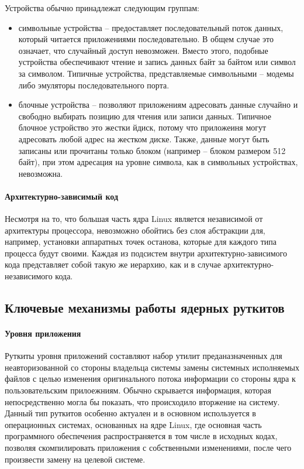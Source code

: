\documentclass{gost7.32-2001}
\begin{document}
Устройства обычно принадлежат следующим группам:
\begin{itemize}
\item
  символьные устройства – предоставляет последовательный поток данных,
  который читается приложениями последовательно. В общем случае это
  означает, что случайный доступ невозможен. Вместо этого, подобные
  устройства обеспечивают чтение и запись данных байт за байтом или
  символ за символом. Типичные устройства, представляемые символьными
  – модемы либо эмуляторы последовательного порта.
\item
  блочные устройства – позволяют приложениям адресовать данные
  случайно и свободно выбирать позицию для чтения или записи
  данных. Типичное блочное устройство это жестки йдиск, потому что
  приложеиня могут адресовать любой адрес на жестком диске. Также,
  данные могут быть записаны или прочитаны только блоком (например –
  блоком размером 512 байт), при этом адресация на уровне символа, как
  в символьных устройствах, невозможна.
\end{itemize}

\paragraph{Архитектурно-зависимый код}

Несмотря на то, что большая часть ядра Linux является независимой от
архитектуры процессора, невозможно обойтись без слоя абстракции для,
например, установки аппаратных точек останова, которые для каждого
типа процесса будут своими. Каждая из подсистем внутри
архитектурно-зависимого кода представляет собой такую же иерархию, как
и в случае архитектурно-независимого кода.

\subsection{Ключевые механизмы работы ядерных руткитов}
\paragraph{Уровня приложения}
Руткиты уровня приложений составляют набор утилит преданазначенных для
неавторизованной со стороны владельца системы замены системных
исполняемых файлов с целью изменения оригинального потока информации
со стороны ядра к пользовательским прилоежниям. Обычно скрывается
информация, которая непосредственно могла бы показать, что происходило
вторжение на систему. Данный тип руткитов особенно актуален и в
основном используется в операционных системах, основанных на ядре Linux,
где основная часть программного обеспечения распространяется в том
числе в исходных кодах, позволяя скомпилировать приложения с
собственными изменениями, после чего произвести замену на целевой
системе.
\end{document}
